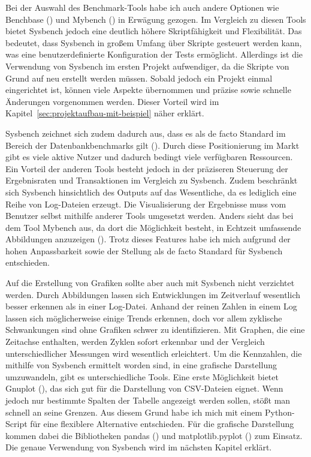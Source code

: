 Bei der Auswahl des Benchmark-Tools habe ich auch andere Optionen wie Benchbase (\cite{DifallahPCC13}) und Mybench (\cite{mybench_repo}) in Erwägung gezogen.
Im Vergleich zu diesen Tools bietet Sysbench jedoch eine deutlich höhere Skriptfähigkeit und Flexibilität.
Das bedeutet, dass Sysbench in großem Umfang über Skripte gesteuert werden kann, was eine benutzerdefinierte Konfiguration der Tests ermöglicht.
Allerdings ist die Verwendung von Sysbench im ersten Projekt aufwendiger, da die Skripte von Grund auf neu erstellt werden müssen.
Sobald jedoch ein Projekt einmal eingerichtet ist, können viele Aspekte übernommen und präzise sowie schnelle Änderungen vorgenommen werden.
Dieser Vorteil wird im Kapitel~\ref{sec:projektaufbau-mit-beispiel} näher erklärt.

Sysbench zeichnet sich zudem dadurch aus, dass es als de facto Standard im Bereich der Datenbankbenchmarks gilt (\cite{mybench_comparison}).
Durch diese Positionierung im Markt gibt es viele aktive Nutzer und dadurch bedingt viele verfügbaren Ressourcen.
Ein Vorteil der anderen Tools besteht jedoch in der präziseren Steuerung der Ergebnisraten und Transaktionen im Vergleich zu Sysbench.
Zudem beschränkt sich Sysbench hinsichtlich des Outputs auf das Wesentliche, da es lediglich eine Reihe von Log-Dateien erzeugt.
Die Visualisierung der Ergebnisse muss vom Benutzer selbst mithilfe anderer Tools umgesetzt werden.
Anders sieht das bei dem Tool Mybench aus, da dort die Möglichkeit besteht, in Echtzeit umfassende Abbildungen anzuzeigen (\cite{mybench_user_interface}).
Trotz dieses Features habe ich mich aufgrund der hohen Anpassbarkeit sowie der Stellung als de facto Standard für Sysbench entschieden.

Auf die Erstellung von Grafiken sollte aber auch mit Sysbench nicht verzichtet werden.
Durch Abbildungen lassen sich Entwicklungen im Zeitverlauf wesentlich besser erkennen als in einer Log-Datei.
Anhand der reinen Zahlen in einem Log lassen sich möglicherweise einige Trends erkennen, doch vor allem zyklische Schwankungen sind ohne Grafiken schwer zu identifizieren.
Mit Graphen, die eine Zeitachse enthalten, werden Zyklen sofort erkennbar und der Vergleich unterschiedlicher Messungen wird wesentlich erleichtert.
Um die Kennzahlen, die mithilfe von Sysbench ermittelt worden sind, in eine grafische Darstellung umzuwandeln, gibt es unterschiedliche Tools.
Eine erste Möglichkeit bietet Gnuplot (\cite{gnuplot}), das sich gut für die Darstellung von CSV-Dateien eignet.
Wenn jedoch nur bestimmte Spalten der Tabelle angezeigt werden sollen, stößt man schnell an seine Grenzen.
Aus diesem Grund habe ich mich mit einem Python-Script für eine flexiblere Alternative entschieden.
Für die grafische Darstellung kommen dabei die Bibliotheken pandas (\cite{reback2020pandas}) und matplotlib.pyplot (\cite{hunter_2007}) zum Einsatz.
Die genaue Verwendung von Sysbench wird im nächsten Kapitel erklärt.